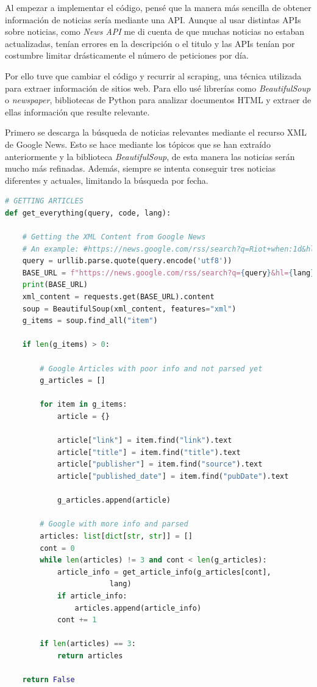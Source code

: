 Al empezar a implementar el código, pensé que la manera más sencilla de obtener información de noticias sería mediante una API. Aunque al usar distintas APIs sobre noticias, como \textit{News API} me di cuenta de que muchas noticias no estaban actualizadas, tenían errores en la descripción o el titulo y las APIs tenían por costumbre limitar drásticamente el número de peticiones por día.

\vspace{0.3cm}

Por ello tuve que cambiar el código y recurrir al scraping, una técnica utilizada para extraer información de sitios web. Para ello usé librerías como \textit{BeautifulSoup} o \textit{newspaper}, bibliotecas de Python para analizar documentos HTML y extraer de ellas información que resulte relevante.

\vspace{0.3cm}

Primero se descarga la búsqueda de noticias relevantes mediante el recurso XML de Google News. Esto se hace mediante los tópicos que se han extraído anteriormente y la biblioteca \textit{BeautifulSoup}, de esta manera las noticias serán mucho más refinadas. Además, siempre se intenta conseguir tres noticias diferentes y actuales, limitando la búsqueda por fecha.

\newpage

\begin{lstlisting}[caption=Extracción de las noticias,language=Python, mathescape=true]
# GETTING ARTICLES
def get_everything(query, code, lang):

    # Getting the XML Content from Google News
    # An example: #https://news.google.com/rss/search?q=Riot+when:1d&hl=es&gl=ES&ceid=ES:es
    query = urllib.parse.quote(query.encode('utf8'))
    BASE_URL = f"https://news.google.com/rss/search?q={query}&hl={lang}&gl={code}&ceid={code}:{lang}"
    print(BASE_URL)
    xml_content = requests.get(BASE_URL).content
    soup = BeautifulSoup(xml_content, features="xml")
    g_items = soup.find_all("item")

    if len(g_items) > 0:

        # Google Articles with poor info and not parsed yet
        g_articles = []

        for item in g_items:
            article = {}

            article["link"] = item.find("link").text
            article["title"] = item.find("title").text
            article["publisher"] = item.find("source").text
            article["published_date"] = item.find("pubDate").text

            g_articles.append(article)

        # Google with more info and parsed
        articles: list[dict[str, str]] = []
        cont = 0
        while len(articles) != 3 and cont < len(g_articles):
            article_info = get_article_info(g_articles[cont],
                        lang)
            if article_info:
                articles.append(article_info)
            cont += 1

        if len(articles) == 3:
            return articles

    return False
\end{lstlisting}

